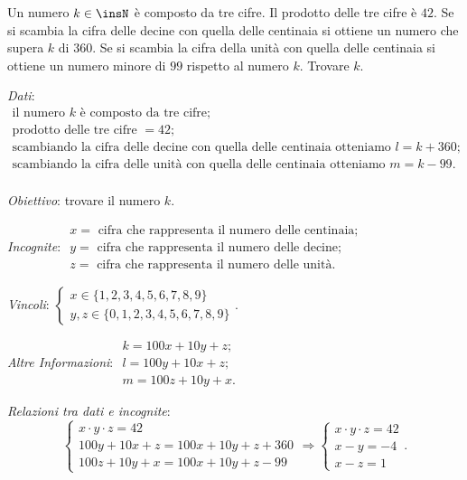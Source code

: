 \begin{problema}
Un numero \(k\in \insN\) è composto da tre cifre. Il prodotto delle tre cifre è \(42\). Se si scambia la cifra delle decine con quella delle centinaia si ottiene un numero che supera \(k\) di \(360\). Se si scambia la cifra della unità con quella delle centinaia si ottiene un numero minore di \(99\) rispetto al numero \(k\). Trovare \(k\).
\end{problema}

\emph{Dati}: \(\begin{array}{l}
\text{il numero } k \text{ è composto da tre cifre};\\
\text{prodotto delle tre cifre } = 42;\\
\text{scambiando la cifra delle decine con quella delle centinaia otteniamo }l=k+360; \\
\text{scambiando la cifra delle unità con quella delle centinaia otteniamo } m=k-99.\\
\end{array}\)

\emph{Obiettivo}: trovare il numero \(k\).

\emph{Incognite}: \(\begin{array}{l}
x =\text{ cifra che rappresenta il numero delle centinaia;}\\
y=\text{ cifra che rappresenta il numero delle decine;}\\
z=\text{ cifra che rappresenta il numero delle unità.}
\end{array}\)

\emph{Vincoli}: \(\left\{\begin{array}{l}x\in \{1,2,3,4,5,6,7,8,9\} \\y,z\in \{0,1,2,3,4,5,6,7,8,9\}\end{array}\right.\).

\emph{Altre Informazioni}: \(\begin{array}{l}
k=100x+10y+z;\\
l=100y+10x+z;\\
m=100z+10y+x.
\end{array}\)

\emph{Relazioni tra dati e incognite}: \[ \left\{\begin{array}{l}x\cdot y\cdot z=42 \\100y+10x+z=100x+10y+z+360\\100z+10y+x=100x+10y+z-99 \end{array}\right.\Rightarrow \left\{\begin{array}{l}x\cdot y\cdot z=42 \\x-y=-4\\x-z=1\end{array}\right.. \]

